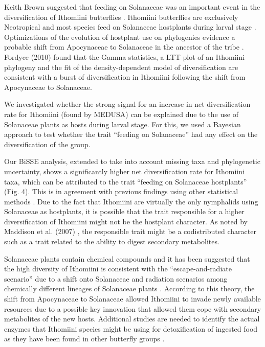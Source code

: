 \documentclass[10pt]{article}
\begin{document}
Keith Brown suggested that feeding on Solanaceae was an important event
in the diversification of Ithomiini butterflies \cite{brown1987}. Ithomiini
butterflies are exclusively Neotropical and most species feed on
Solanaceae hostplants during larval stage \cite{willmott2006}. Optimizations of the
evolution of hostplant use on phylogenies evidence a probable shift from
Apocynaceae to Solanaceae in the ancestor of the tribe \cite{willmott2006, brower2006}.
Fordyce (2010) \cite{fordyce2010} found that the Gamma statistics, a LTT plot of
an Ithomiini phylogeny and the fit of the density-dependent model of
diversification are consistent with a burst of diversification in
Ithomiini following the shift from Apocynaceae to Solanaceae.

We investigated whether the strong signal for an increase in net
diversification rate for Ithomiini (found by MEDUSA) can be explained
due to the use of Solanaceae plants as hosts during larval stage. For
this, we used a Bayesian approach \cite{fitzjohn2009} to test whether the trait
``feeding on Solanaceae'' had any effect on the diversification of the
group.

Our BiSSE analysis, extended to take into account missing taxa and
phylogenetic uncertainty, shows a significantly higher net
diversification rate for Ithomiini taxa, which can be attributed to the
trait ``feeding on Solanaceae hostplants'' (Fig. 4). This is in
agreement with previous findings using other statistical methods
\cite{fordyce2010}. Due to the fact that Ithomiini are virtually the only
nymphalids using Solanaceae as hostplants, it is possible that the trait
responsible for a higher diversification of Ithomiini might not be the
hostplant character. As noted by Maddison et al. (2007) \cite{maddison2007}, the
responsible trait might be a codistributed character such as a trait
related to the ability to digest secondary metabolites.

Solanaceae plants contain chemical compounds and it has been suggested
that the high diversity of Ithomiini is consistent with the
``escape-and-radiate scenario'' due to a shift onto Solanaceae
\cite{fordyce2010}
and radiation scenarios among chemically different lineages of
Solanaceae plants \cite{willmott2006, brown1987}. According to this theory, the shift from
Apocynaceae to Solanaceae allowed Ithomiini to invade newly available
resources due to a possible key innovation that allowed them cope with
secondary metabolites of the new hosts. Additional studies are needed to
identify the actual enzymes that Ithomiini species might be using for
detoxification of ingested food as they have been found in other
butterfly groups \cite{wheat2007}.
\end{document}
